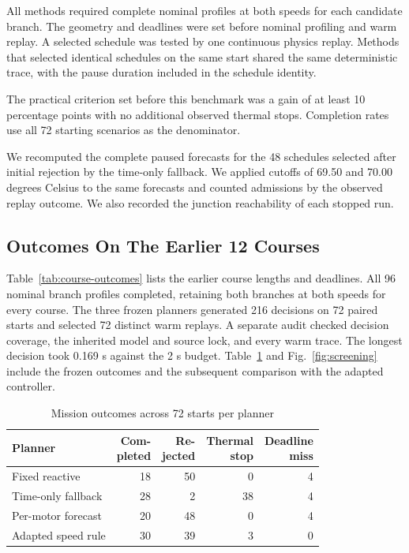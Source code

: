 \documentclass{ieeeaccess}
\begin{document}
All methods required complete nominal profiles at both speeds for each candidate branch. The geometry and deadlines were set before nominal profiling and warm replay. A selected schedule was tested by one continuous physics replay. Methods that selected identical schedules on the same start shared the same deterministic trace, with the pause duration included in the schedule identity.

The practical criterion set before this benchmark was a gain of at least 10 percentage points with no additional observed thermal stops. Completion rates use all 72 starting scenarios as the denominator.

We recomputed the complete paused forecasts for the 48 schedules selected after initial rejection by the time-only fallback. We applied cutoffs of 69.50 and 70.00 degrees Celsius to the same forecasts and counted admissions by the observed replay outcome. We also recorded the junction reachability of each stopped run.

\subsection{Outcomes On The Earlier 12 Courses}

Table~\ref{tab:course-outcomes} lists the earlier course lengths and deadlines. All 96 nominal branch profiles completed, retaining both branches at both speeds for every course. The three frozen planners generated 216 decisions on 72 paired starts and selected 72 distinct warm replays. A separate audit checked decision coverage, the inherited model and source lock, and every warm trace. The longest decision took 0.169 s against the 2 s budget. Table~\ref{tab:outcomes} and Fig.~\ref{fig:screening} include the frozen outcomes and the subsequent comparison with the adapted controller.

\begin{table}[!t]
\caption{Mission outcomes across 72 starts per planner}
\label{tab:outcomes}
\centering
\footnotesize
\setlength{\tabcolsep}{4pt}
\renewcommand{\arraystretch}{1.18}
\begin{tabular}{@{}lrrrr@{}}
\hline
Planner & \shortstack{Com-\\pleted} & \shortstack{Re-\\jected} & \shortstack{Thermal\\stop} & \shortstack{Deadline\\miss} \\
\hline
Fixed reactive & 18 & 50 & 0 & 4 \\
Time-only fallback & 28 & 2 & 38 & 4 \\
Per-motor forecast & 20 & 48 & 0 & 4 \\
Adapted speed rule & 30 & 39 & 3 & 0 \\
\hline
\end{tabular}
\end{table}
\end{document}
